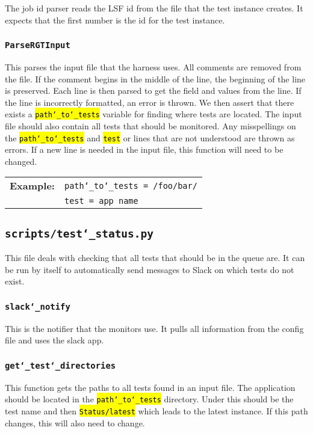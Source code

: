 \documentclass{article}
\newcommand{\un}[0]{\char`_}
\newcommand{\code}[1]{\textcolor{red}{\hl{\texttt{#1}}}}
\begin{document}
The job id parser reads the LSF id from the file that the test instance creates. It expects that the first number is the id for the test instance.

\subsubsection{\texttt{ParseRGTInput}}

This parses the input file that the harness uses. All comments are removed from the file. If the comment begins in the middle of the line, the beginning of the line is preserved. Each line is then parsed to get the field and values from the line. If the line is incorrectly formatted, an error is thrown. We then assert that there exists a \code{path\un to\un tests} variable for finding where tests are located. The input file should also contain all tests that should be monitored. Any misspellings on the \code{path\un to\un tests} and \code{test} or lines that are not understood are thrown as errors. If a new line is needed in the input file, this function will need to be changed.

\begin{tabular}{ l p{\textwidth} }
	\textbf{Example:} & \texttt{path\un to\un tests = /foo/bar/} \\
	& \texttt{test = app name}
\end{tabular}

\subsection{\texttt{scripts/test\un status.py}}

This file deals with checking that all tests that should be in the queue are. It can be run by itself to automatically send messages to Slack on which tests do not exist.

\subsubsection{\texttt{slack\un notify}}

This is the notifier that the monitors use. It pulls all information from the config file and uses the slack app.

\subsubsection{\texttt{get\un test\un directories}}

This function gets the paths to all tests found in an input file. The application should be located in the \code{path\un to\un tests} directory. Under this should be the test name and then \code{Status/latest} which leads to the latest instance. If this path changes, this will also need to change.
\end{document}
